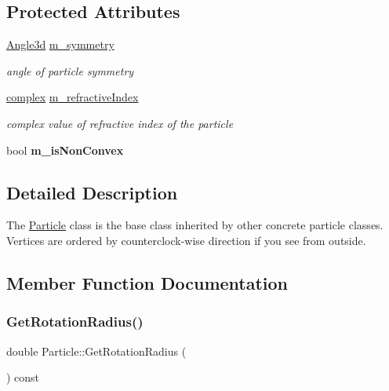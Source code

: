 \subsection*{Protected Attributes}
\begin{DoxyCompactItemize}
\item 
\mbox{\label{class_particle_a54a7726a6a0a4aff34d9c6089a23ce1d}} 
\mbox{\hyperlink{class_angle3d}{Angle3d}} \mbox{\hyperlink{class_particle_a54a7726a6a0a4aff34d9c6089a23ce1d}{m\+\_\+symmetry}}
\begin{DoxyCompactList}\small\item\em angle of particle symmetry \end{DoxyCompactList}\item 
\mbox{\label{class_particle_a2285c983db1931fd823a44d104ddb578}} 
\mbox{\hyperlink{classcomplex}{complex}} \mbox{\hyperlink{class_particle_a2285c983db1931fd823a44d104ddb578}{m\+\_\+refractive\+Index}}
\begin{DoxyCompactList}\small\item\em complex value of refractive index of the particle \end{DoxyCompactList}\item 
\mbox{\label{class_particle_a95ebda6d49685a57da79d849fca898ab}} 
bool {\bfseries m\+\_\+is\+Non\+Convex}
\end{DoxyCompactItemize}


\subsection{Detailed Description}
The \mbox{\hyperlink{class_particle}{Particle}} class is the base class inherited by other concrete particle classes. Vertices are ordered by counterclock-\/wise direction if you see from outside. 

\subsection{Member Function Documentation}
\mbox{\label{class_particle_ab06b62449ba3213e3f8bf580a910dd66}} 
\subsubsection{\texorpdfstring{Get\+Rotation\+Radius()}{GetRotationRadius()}}
{\footnotesize\ttfamily double Particle\+::\+Get\+Rotation\+Radius (\begin{DoxyParamCaption}{ }\end{DoxyParamCaption}) const}



